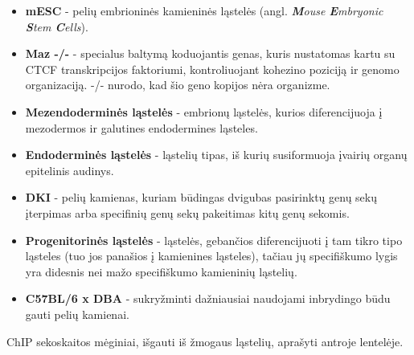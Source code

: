 \documentclass[12pt]{article}
\begin{document}
\begin{itemize}
    \item \textbf{mESC} - pelių embrioninės kamieninės ląstelės
          (angl. \emph{\textbf{M}ouse \textbf{E}mbryonic \textbf{S}tem
          \textbf{C}ells}).
    \item \textbf{Maz -/-} - specialus baltymą koduojantis genas, kuris
          nustatomas kartu su CTCF transk\-rip\-ci\-jos faktoriumi,
          kontroliuojant kohezino poziciją ir genomo organizaciją. -/- nurodo,
          kad šio geno kopijos nėra organizme.
    \item \textbf{Mezendoderminės ląstelės} - embrionų ląstelės, kurios
          diferencijuoja į mezodermos ir galutines endodermines ląsteles.
    \item \textbf{Endoderminės ląstelės} - ląstelių tipas, iš kurių 
          susiformuoja įvairių organų epitelinis audinys.
    \item \textbf{DKI} - pelių kamienas, kuriam būdingas dvigubas
          pasirinktų genų sekų įterpimas arba specifinių genų sekų pakeitimas
          kitų genų sekomis.
    \item \textbf{Progenitorinės ląstelės} - ląstelės, gebančios diferencijuoti
          į tam tikro tipo ląsteles (tuo jos panašios į kamienines ląsteles),
          tačiau jų specifiškumo lygis yra didesnis nei mažo specifiškumo
          kamieninių ląstelių.
    \item \textbf{C57BL/6 x DBA} - sukryžminti dažniausiai naudojami inbrydingo
          būdu gauti pelių kamienai.
\end{itemize}

ChIP sekoskaitos mėginiai, išgauti iš žmogaus ląstelių, aprašyti antroje
lentelėje.
\end{document}
